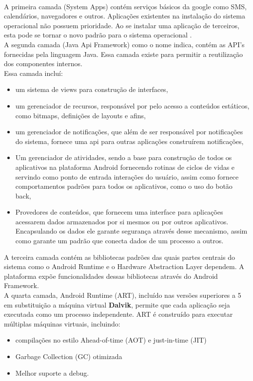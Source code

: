 \documentclass[12pt]{article}
\begin{document}
\\A primeira camada (System Apps) contém serviços básicos da google como SMS, calendários, navegadores e outros. Aplicações existentes na instalação do sistema operacional não possuem prioridade. Ao se instalar uma aplicação de terceiros, esta pode se tornar o novo padrão para o sistema operacional \cite{developer:platform}.
\\A segunda camada (Java Api Framework) como o nome indica, contém as API’s fornecidas pela linguagem Java. Essa camada existe para permitir a reutilização dos componentes internos.
\\Essa camada incluí:
\begin{itemize}
	\item um sistema de views para construção de interfaces,
	\item um gerenciador de recursos, responsável por pelo acesso a conteúdos estáticos, como bitmaps, definições de layouts e afins,
	\item um gerenciador de notificações, que além de ser responsável por notificações do sistema, fornece uma api para outras aplicações construírem notificações,
	\item Um gerenciador de atividades, sendo a base para construção de todos os aplicativos na plataforma Android fornecendo rotinas de ciclos de vidas e servindo como ponto de entrada interações do usuário, assim como fornece comportamentos padrões para todos os aplicativos, como o uso do botão back,
	\item Provedores de conteúdos, que fornecem uma interface para aplicações acessarem dados armazenados por si mesmos ou por outros aplicativos. Encapsulando os dados ele garante segurança através desse mecanismo, assim como garante um padrão que conecta dados de um processo a outros.
\end{itemize}
A terceira camada contém as bibliotecas padrões das quais partes centrais do sistema como o Android Runtime e o Hardware Abstraction Layer dependem. A plataforma expõe funcionalidades dessas bibliotecas através do Android Framework.
\\A quarta camada, Android Runtime (ART), incluído nas versões superiores a 5 em substituição a máquina virtual \textbf{Dalvik}, permite que cada aplicação seja executada como um processo independente. ART é construído para executar múltiplas máquinas virtuais, incluindo: 
\begin{itemize}
	\item compilações no estilo Ahead-of-time (AOT) e just-in-time (JIT)
	\item Garbage Collection (GC) otimizada
	\item Melhor suporte a debug.
\end{itemize}
\end{document}
